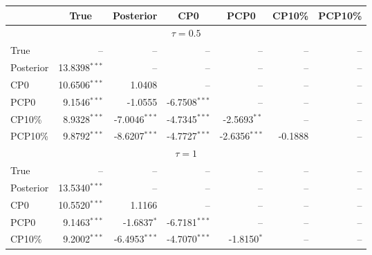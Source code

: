 { \renewcommand{\arraystretch}{1.2} 
 {\footnotesize 
\begin{table} 
\center 
\begin{tabular}{l | rrrrrr} 
& \multicolumn{1}{c}{True}& \multicolumn{1}{c}{Posterior}& \multicolumn{1}{c}{CP0}& \multicolumn{1}{c}{PCP0}& \multicolumn{1}{c}{CP10\%}& \multicolumn{1}{c}{PCP10\%} \\ \hline 
\multicolumn{7}{c}{$\tau = 0.5$} \\ \hline 
True &    --\phantom{$^{***}$} &    --\phantom{$^{***}$} &    --\phantom{$^{***}$} &    --\phantom{$^{***}$} &    --\phantom{$^{***}$} &    --\phantom{$^{***}$}   \\ 
Posterior & 13.8398$^{***}$ &    --\phantom{$^{***}$} &    --\phantom{$^{***}$} &    --\phantom{$^{***}$} &    --\phantom{$^{***}$} &    --\phantom{$^{***}$}   \\ 
CP0 & 10.6506$^{***}$ & 1.0408\phantom{$^{***}$} &    --\phantom{$^{***}$} &    --\phantom{$^{***}$} &    --\phantom{$^{***}$} &    --\phantom{$^{***}$}   \\ 
PCP0 & 9.1546$^{***}$ & -1.0555\phantom{$^{***}$} & -6.7508$^{***}$ &    --\phantom{$^{***}$} &    --\phantom{$^{***}$} &    --\phantom{$^{***}$}   \\ 
CP10\% & 8.9328$^{***}$ & -7.0046$^{***}$ & -4.7345$^{***}$ & -2.5693$^{**}$\phantom{$^{*}$} &    --\phantom{$^{***}$} &    --\phantom{$^{***}$}   \\ 
PCP10\% & 9.8792$^{***}$ & -8.6207$^{***}$ & -4.7727$^{***}$ & -2.6356$^{***}$ & -0.1888\phantom{$^{***}$} &    --\phantom{$^{***}$}   \\ 
\hline 
\multicolumn{7}{c}{$\tau = 1$} \\ \hline 
True &    --\phantom{$^{***}$} &    --\phantom{$^{***}$} &    --\phantom{$^{***}$} &    --\phantom{$^{***}$} &    --\phantom{$^{***}$} &    --\phantom{$^{***}$}   \\ 
Posterior & 13.5340$^{***}$ &    --\phantom{$^{***}$} &    --\phantom{$^{***}$} &    --\phantom{$^{***}$} &    --\phantom{$^{***}$} &    --\phantom{$^{***}$}   \\ 
CP0 & 10.5520$^{***}$ & 1.1166\phantom{$^{***}$} &    --\phantom{$^{***}$} &    --\phantom{$^{***}$} &    --\phantom{$^{***}$} &    --\phantom{$^{***}$}   \\ 
PCP0 & 9.1463$^{***}$ & -1.6837$^{*}$\phantom{$^{**}$} & -6.7181$^{***}$ &    --\phantom{$^{***}$} &    --\phantom{$^{***}$} &    --\phantom{$^{***}$}   \\ 
CP10\% & 9.2002$^{***}$ & -6.4953$^{***}$ & -4.7070$^{***}$ & -1.8150$^{*}$\phantom{$^{**}$} &    --\phantom{$^{***}$} &    --\phantom{$^{***}$}   \\ 

\end{tabular}
\end{table}}}
